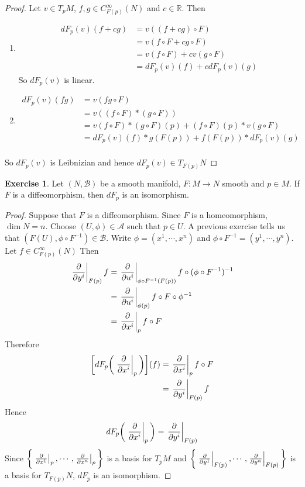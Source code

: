 \documentclass[12pt]{amsart}
\theoremstyle{definition}
\newtheorem{ex}[definition]{Exercise}
\newcommand{\R}{\mathbb{R}}
\newcommand{\MA}{\mathcal{A}}
\newcommand{\MB}{\mathcal{B}}
\begin{document}
	\begin{proof}
	Let $v \in T_pM$, $f,g \in C_{F(p)}^{\infty}(N)$ and $c \in \R$. Then 
	\begin{enumerate}
	\item 
	\begin{align*}
		dF_p(v)(f+cg) 
		&= v((f+cg) \circ F) \\
		&= v(f \circ F + c g \circ F) \\
		&= v(f \circ F) + cv(g \circ F) \\
		&= dF_p(v)(f) + c dF_p(v)(g)
	\end{align*}
	So $dF_p(v)$ is linear.
	\item 
	\begin{align*}
	dF_p(v)(fg) 
	&= v (fg \circ F) \\
	&= v((f \circ F)* (g \circ F)) \\
	&= v(f \circ F)*(g \circ F)(p) +  (f \circ F)(p)* v(g \circ F) \\
	&= dF_p(v)(f) * g(F(p)) + f(F(p))*dF_p(v)(g) \\
	\end{align*}
	\end{enumerate}
	So $dF_p(v)$ is Leibnizian and hence $dF_p(v) \in T_{F(p)}N$
	\end{proof}

	\begin{ex}
		Let $(N, \MB)$ be a smooth manifold, $F: M \rightarrow N$ smooth and $p \in M$. If $F$ is a diffeomorphism, then $dF_p$ is an isomorphism.
	\end{ex}
	
	\begin{proof}
		Suppose that $F$ is a diffeomorphism. Since $F$ is a homeomorphism, $\dim N = n$. Choose $(U, \phi) \in \MA$ such that $p \in U$. A previous exercise tells us that $(F(U), \phi \circ F^{-1}) \in \MB$. Write $\phi = (x^1, \cdots, x^n)$ and $\phi \circ F^{-1} = (y^1, \cdots, y^n)$. Let $f \in C^{\infty}_{F(p)}(N)$ Then 
		\begin{align*}
			\eval{\pdv{y^i}}_{F(p)} f
			&= 	\eval{\pdv{u^i}}_{\phi \circ F^{-1} (F(p))} f \circ (\phi \circ F^{-1})^{-1} \\
			&= 	\eval{\pdv{u^i}}_{\phi(p)} f \circ F \circ \phi^{-1} \\
			&= 	\eval{\pdv{x^i}}_p f \circ F \\
		\end{align*}
		Therefore 
		\begin{align*}
			\bigg[ dF_p \bigg( \eval{\pdv{x^i}}_p \bigg) \bigg] (f)
			&= \eval{\pdv{x^i}}_p f \circ F \\
			&= \eval{\pdv{y^i}}_{F(p)} f 
		\end{align*}
	Hence $$dF_p \bigg( \eval{\pdv{x^i}}_p \bigg) = \eval{\pdv{y^i}}_{F(p)}$$ 
	Since $\bigg \{\eval{\pdv{x^1}}_{p}, \cdots, \eval{\pdv{x^n}}_{p} \bigg \}$ is a basis for $T_pM$ and $\bigg \{\eval{\pdv{y^1}}_{F(p)}, \cdots, \eval{\pdv{y^n}}_{F(p)} \bigg \}$ is a basis for $T_{F(p)}N$, $dF_p$ is an isomorphism.
	\end{proof}
\end{document}
